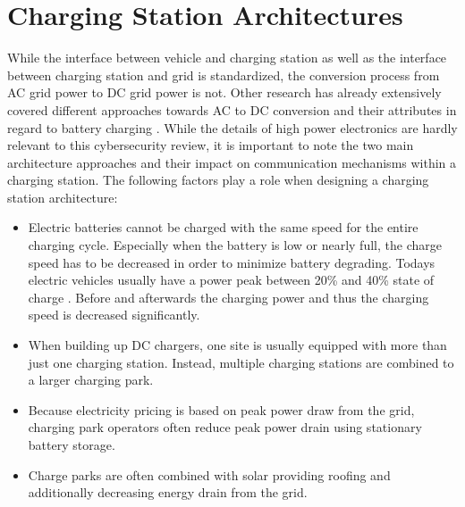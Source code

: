 \documentclass[conference,flushend]{iaria} %
\begin{document}
\section{Charging Station Architectures}
While the interface between vehicle and charging station as well as the interface between charging station and grid is standardized, the conversion process from AC grid power to DC grid power is not.
Other research has already extensively covered different approaches towards AC to DC conversion and their attributes in regard to battery charging \cite{tu_extreme_2019, das_electric_2020, deb_review_2021}.
While the details of high power electronics are hardly relevant to this cybersecurity review, it is important to note the two main architecture approaches and their impact on communication mechanisms within a charging station.
The following factors play a role when designing a charging station architecture:
\begin{itemize}
    \item Electric batteries cannot be charged with the same speed for the entire charging cycle.
    Especially when the battery is low or nearly full, the charge speed has to be decreased in order to minimize battery degrading.
    Todays electric vehicles usually have a power peak between 20\% and 40\% state of charge \cite{noauthor_audi_nodate}.
    Before and afterwards the charging power and thus the charging speed is decreased significantly.
    \item When building up DC chargers, one site is usually equipped with more than just one charging station. Instead, multiple charging stations are combined to a larger charging park.
    \item Because electricity pricing is based on peak power draw from the grid, charging park operators often reduce peak power drain using stationary battery storage.
    \item Charge parks are often combined with solar providing roofing and additionally decreasing energy drain from the grid.
\end{itemize}
\end{document}
